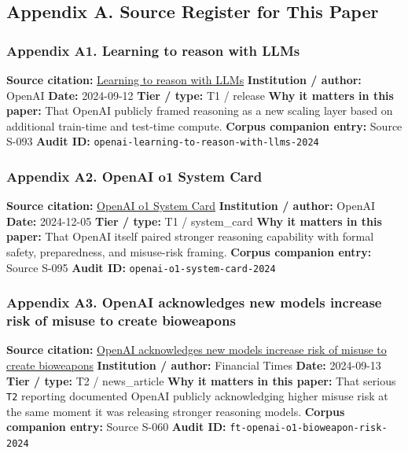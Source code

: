 \documentclass[
  american,
  11pt,
  letterpaper,
]{article}
\begin{document}
\subsection{Appendix A. Source Register for This
Paper}\label{appendix-a.-source-register-for-this-paper}

\subsubsection{Appendix A1. Learning to reason with
LLMs}\label{appendix-a1-learning-to-reason-with-llms}

\textbf{Source citation:}
\href{https://openai.com/index/learning-to-reason-with-llms/}{Learning
to reason with LLMs} \textbf{Institution / author:} OpenAI
\textbf{Date:} 2024-09-12 \textbf{Tier / type:} T1 / release \textbf{Why
it matters in this paper:} That OpenAI publicly framed reasoning as a
new scaling layer based on additional train-time and test-time compute.
\textbf{Corpus companion entry:} Source S-093 \textbf{Audit ID:}
\texttt{openai-learning-to-reason-with-llms-2024}

\subsubsection{Appendix A2. OpenAI o1 System
Card}\label{appendix-a2-openai-o1-system-card}

\textbf{Source citation:}
\href{https://openai.com/index/openai-o1-system-card/}{OpenAI o1 System
Card} \textbf{Institution / author:} OpenAI \textbf{Date:} 2024-12-05
\textbf{Tier / type:} T1 / system\_card \textbf{Why it matters in this
paper:} That OpenAI itself paired stronger reasoning capability with
formal safety, preparedness, and misuse-risk framing. \textbf{Corpus
companion entry:} Source S-095 \textbf{Audit ID:}
\texttt{openai-o1-system-card-2024}

\subsubsection{Appendix A3. OpenAI acknowledges new models increase risk
of misuse to create
bioweapons}\label{appendix-a3-openai-acknowledges-new-models-increase-risk-of-misuse-to-create-bioweapons}

\textbf{Source citation:}
\href{https://www.ft.com/content/37ba7236-2a64-4807-b1e1-7e21ee7d0914}{OpenAI
acknowledges new models increase risk of misuse to create bioweapons}
\textbf{Institution / author:} Financial Times \textbf{Date:} 2024-09-13
\textbf{Tier / type:} T2 / news\_article \textbf{Why it matters in this
paper:} That serious \texttt{T2} reporting documented OpenAI publicly
acknowledging higher misuse risk at the same moment it was releasing
stronger reasoning models. \textbf{Corpus companion entry:} Source S-060
\textbf{Audit ID:} \texttt{ft-openai-o1-bioweapon-risk-2024}
\end{document}

